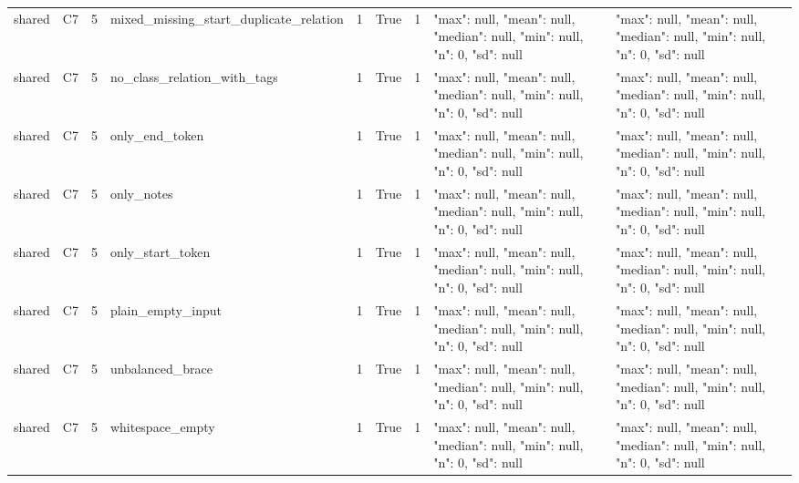 \begin{tabular}{lllllllll}
shared & C7 & 5 & mixed\_missing\_start\_duplicate\_relation & 1 & True & 1 & {"max": null, "mean": null, "median": null, "min": null, "n": 0, "sd": null} & {"max": null, "mean": null, "median": null, "min": null, "n": 0, "sd": null} \\
shared & C7 & 5 & no\_class\_relation\_with\_tags & 1 & True & 1 & {"max": null, "mean": null, "median": null, "min": null, "n": 0, "sd": null} & {"max": null, "mean": null, "median": null, "min": null, "n": 0, "sd": null} \\
shared & C7 & 5 & only\_end\_token & 1 & True & 1 & {"max": null, "mean": null, "median": null, "min": null, "n": 0, "sd": null} & {"max": null, "mean": null, "median": null, "min": null, "n": 0, "sd": null} \\
shared & C7 & 5 & only\_notes & 1 & True & 1 & {"max": null, "mean": null, "median": null, "min": null, "n": 0, "sd": null} & {"max": null, "mean": null, "median": null, "min": null, "n": 0, "sd": null} \\
shared & C7 & 5 & only\_start\_token & 1 & True & 1 & {"max": null, "mean": null, "median": null, "min": null, "n": 0, "sd": null} & {"max": null, "mean": null, "median": null, "min": null, "n": 0, "sd": null} \\
shared & C7 & 5 & plain\_empty\_input & 1 & True & 1 & {"max": null, "mean": null, "median": null, "min": null, "n": 0, "sd": null} & {"max": null, "mean": null, "median": null, "min": null, "n": 0, "sd": null} \\
shared & C7 & 5 & unbalanced\_brace & 1 & True & 1 & {"max": null, "mean": null, "median": null, "min": null, "n": 0, "sd": null} & {"max": null, "mean": null, "median": null, "min": null, "n": 0, "sd": null} \\
shared & C7 & 5 & whitespace\_empty & 1 & True & 1 & {"max": null, "mean": null, "median": null, "min": null, "n": 0, "sd": null} & {"max": null, "mean": null, "median": null, "min": null, "n": 0, "sd": null} \\
\end{tabular}